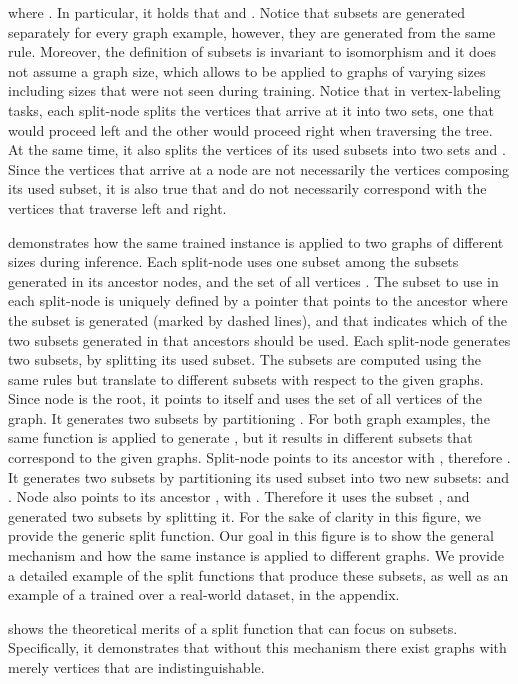 where .
In particular, it holds that   and .
Notice that subsets are generated separately for every graph example, however, they are generated from the same rule. Moreover, the definition of subsets is invariant to isomorphism and it does not assume a graph size, which allows \acronym to be applied to graphs of varying sizes including sizes that were not seen during training.
Notice that in vertex-labeling tasks, each split-node splits the vertices that arrive at it into two sets, one that would proceed left and the other would proceed right when traversing the tree. At the same time, it also splits the vertices of its used subsets into two sets  and . Since the vertices that arrive at a node are not necessarily the vertices composing its used subset, it is also true that  and  do not necessarily correspond with the vertices that traverse left and right.

 demonstrates how the same trained \acronym instance is applied to two graphs of different sizes during inference. Each split-node uses one subset among the subsets generated in its ancestor nodes, and the set of all vertices . The subset to use in each split-node is uniquely defined by a pointer   that points to the ancestor where the subset is generated (marked by dashed lines), and  that indicates which of the two subsets generated in that ancestors should be used. Each split-node generates two subsets, by splitting its used subset. The subsets are computed using the same rules but translate to different subsets with respect to the given graphs.
Since node  is the root, it points to itself and uses the set  of all vertices of the graph. It generates two subsets  by partitioning . For both graph examples, the same function is applied to generate , but it results in different subsets that correspond to the given graphs.
Split-node  points to its ancestor  with , therefore . It generates two subsets by partitioning its used subset  into two new subsets:  and .
Node  also points to its ancestor , with . Therefore it uses the subset , and generated two subsets by splitting it.
For the sake of clarity in this figure, we provide the generic split function. Our goal in this figure is to show the general mechanism and how the same instance is applied to different graphs. We provide a detailed example of the split functions that produce these subsets, as well as an example of a trained \acronym over a real-world dataset, in the appendix.


 shows the theoretical merits of a split function that can focus on subsets. Specifically, it demonstrates that without this mechanism there exist graphs with merely  vertices that are indistinguishable.

